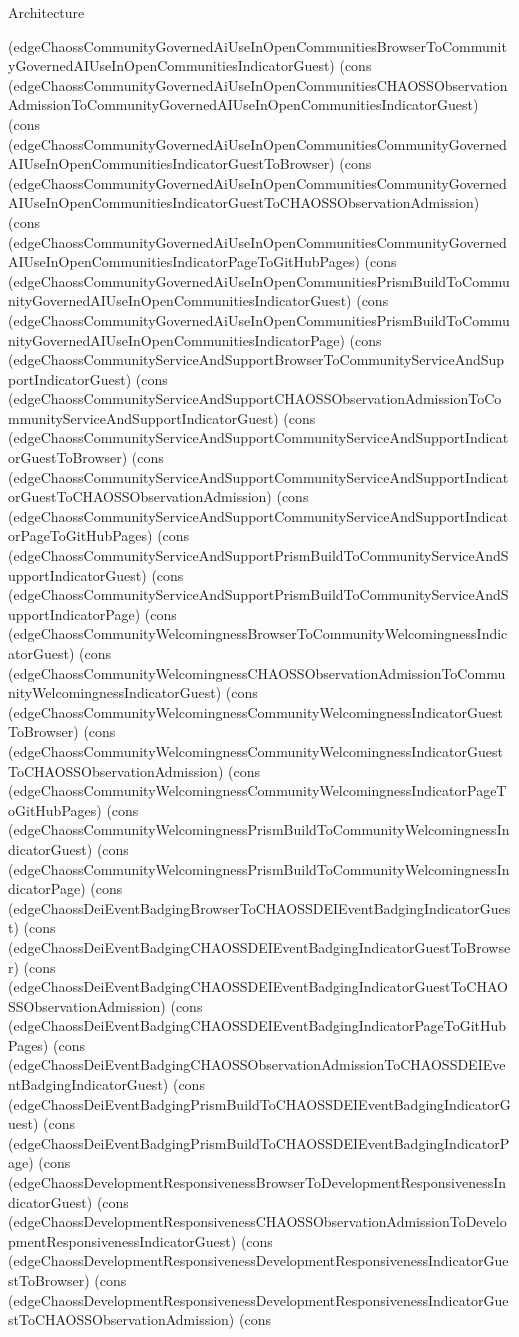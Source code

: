 \begin{lexlean}{Architecture}
\begin{semanticmodule}
{(edgeChaossCommunityGovernedAiUseInOpenCommunitiesBrowserToCommunityGovernedAIUseInOpenCommunitiesIndicatorGuest) (cons (edgeChaossCommunityGovernedAiUseInOpenCommunitiesCHAOSSObservationAdmissionToCommunityGovernedAIUseInOpenCommunitiesIndicatorGuest) (cons (edgeChaossCommunityGovernedAiUseInOpenCommunitiesCommunityGovernedAIUseInOpenCommunitiesIndicatorGuestToBrowser) (cons (edgeChaossCommunityGovernedAiUseInOpenCommunitiesCommunityGovernedAIUseInOpenCommunitiesIndicatorGuestToCHAOSSObservationAdmission) (cons (edgeChaossCommunityGovernedAiUseInOpenCommunitiesCommunityGovernedAIUseInOpenCommunitiesIndicatorPageToGitHubPages) (cons (edgeChaossCommunityGovernedAiUseInOpenCommunitiesPrismBuildToCommunityGovernedAIUseInOpenCommunitiesIndicatorGuest) (cons (edgeChaossCommunityGovernedAiUseInOpenCommunitiesPrismBuildToCommunityGovernedAIUseInOpenCommunitiesIndicatorPage) (cons (edgeChaossCommunityServiceAndSupportBrowserToCommunityServiceAndSupportIndicatorGuest) (cons (edgeChaossCommunityServiceAndSupportCHAOSSObservationAdmissionToCommunityServiceAndSupportIndicatorGuest) (cons (edgeChaossCommunityServiceAndSupportCommunityServiceAndSupportIndicatorGuestToBrowser) (cons (edgeChaossCommunityServiceAndSupportCommunityServiceAndSupportIndicatorGuestToCHAOSSObservationAdmission) (cons (edgeChaossCommunityServiceAndSupportCommunityServiceAndSupportIndicatorPageToGitHubPages) (cons (edgeChaossCommunityServiceAndSupportPrismBuildToCommunityServiceAndSupportIndicatorGuest) (cons (edgeChaossCommunityServiceAndSupportPrismBuildToCommunityServiceAndSupportIndicatorPage) (cons (edgeChaossCommunityWelcomingnessBrowserToCommunityWelcomingnessIndicatorGuest) (cons (edgeChaossCommunityWelcomingnessCHAOSSObservationAdmissionToCommunityWelcomingnessIndicatorGuest) (cons (edgeChaossCommunityWelcomingnessCommunityWelcomingnessIndicatorGuestToBrowser) (cons (edgeChaossCommunityWelcomingnessCommunityWelcomingnessIndicatorGuestToCHAOSSObservationAdmission) (cons (edgeChaossCommunityWelcomingnessCommunityWelcomingnessIndicatorPageToGitHubPages) (cons (edgeChaossCommunityWelcomingnessPrismBuildToCommunityWelcomingnessIndicatorGuest) (cons (edgeChaossCommunityWelcomingnessPrismBuildToCommunityWelcomingnessIndicatorPage) (cons (edgeChaossDeiEventBadgingBrowserToCHAOSSDEIEventBadgingIndicatorGuest) (cons (edgeChaossDeiEventBadgingCHAOSSDEIEventBadgingIndicatorGuestToBrowser) (cons (edgeChaossDeiEventBadgingCHAOSSDEIEventBadgingIndicatorGuestToCHAOSSObservationAdmission) (cons (edgeChaossDeiEventBadgingCHAOSSDEIEventBadgingIndicatorPageToGitHubPages) (cons (edgeChaossDeiEventBadgingCHAOSSObservationAdmissionToCHAOSSDEIEventBadgingIndicatorGuest) (cons (edgeChaossDeiEventBadgingPrismBuildToCHAOSSDEIEventBadgingIndicatorGuest) (cons (edgeChaossDeiEventBadgingPrismBuildToCHAOSSDEIEventBadgingIndicatorPage) (cons (edgeChaossDevelopmentResponsivenessBrowserToDevelopmentResponsivenessIndicatorGuest) (cons (edgeChaossDevelopmentResponsivenessCHAOSSObservationAdmissionToDevelopmentResponsivenessIndicatorGuest) (cons (edgeChaossDevelopmentResponsivenessDevelopmentResponsivenessIndicatorGuestToBrowser) (cons (edgeChaossDevelopmentResponsivenessDevelopmentResponsivenessIndicatorGuestToCHAOSSObservationAdmission) (cons }
\end{semanticmodule}
\end{lexlean}
